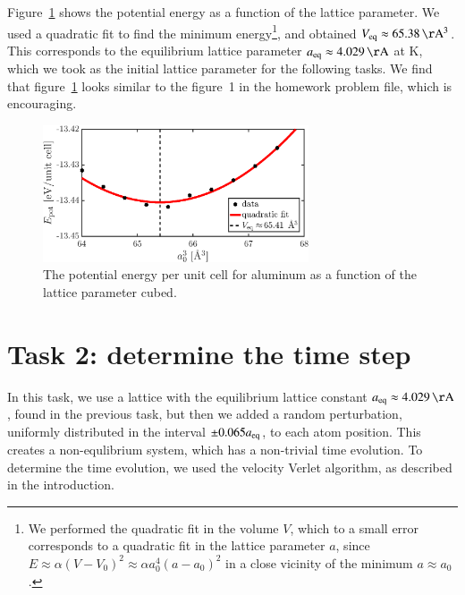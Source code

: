 Figure~\ref{fig1} shows the potential energy as a function of the lattice parameter. We used a quadratic fit to find the minimum energy\footnote{We performed the quadratic fit in the volume $V$, which to a small error corresponds to a quadratic fit in the lattice parameter $a$, since $E \approx  \alpha(V-V_0)^2 \approx \alpha a_0^4 (a-a_0)^2$ in a close vicinity of the minimum $a\approx a_0$.}, and obtained $V_{\rm eq} \approx \unit[65.38]{\AA^3}$. This corresponds to the equilibrium lattice parameter $a_{\rm eq} \approx \unit[4.029]{\AA}$ at \unit[0]{K}, which we took as the initial lattice parameter for the following tasks.  We find that figure~\ref{fig1} looks similar to the figure~1 in the homework problem file, which is encouraging.
\begin{figure}[!ht]
\begin{center}
  \includegraphics[width=0.7\textwidth]{../figures/potential_energy} 
  \caption{The potential energy per unit cell for aluminum as a function of the lattice parameter cubed.}
  \label{fig1}
\end{center}
\end{figure}



\section*{Task 2: determine the time step}
In this task, we use a lattice with the equilibrium lattice constant $a_{\rm eq} \approx \unit[4.029]{\AA}$, found in the previous task, but then we added a random perturbation, uniformly distributed in the interval $\pm0.065a_{\rm eq}$, to each atom position. This creates a non-equlibrium system, which has a non-trivial time evolution. To determine the time evolution, we used the velocity Verlet algorithm, as described in the introduction.

